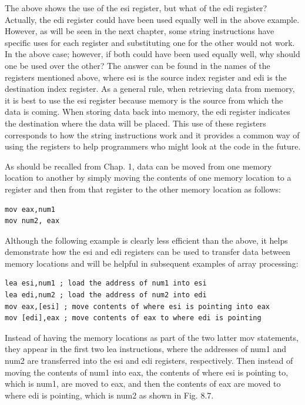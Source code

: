 \documentclass[10pt]{book}
\begin{document}
\begin{center}
\begin{center}
\begin{center}
The above shows the use of the esi register, but what of the edi register? Actually, the edi register could have been used equally well in the above example. However, as will be seen in the next chapter, some string instructions have specific uses for each register and substituting one for the other would not work. In the above case; however, if both could have been used equally well, why should one be used over the other? The answer can be found in the names of the registers mentioned above, where esi is the source index register and edi is the destination index register. As a general rule, when retrieving data from memory, it is best to use the esi register because memory is the source from which the data is coming. When storing data back into memory, the edi register indicates the destination where the data will be placed. This use of these registers corresponds to how the string instructions work and it provides a common way of using the registers to help programmers who might look at the code in the future.

As should be recalled from Chap. 1, data can be moved from one memory location to another by simply moving the contents of one memory location to a register and then from that register to the other memory location as follows:

\begin{verbatim}
mov eax,num1
mov num2, eax
\end{verbatim}

Although the following example is clearly less efficient than the above, it helps demonstrate how the esi and edi registers can be used to transfer data between memory locations and will be helpful in subsequent examples of array processing:

\begin{verbatim}
lea esi,num1 ; load the address of num1 into esi
lea edi,num2 ; load the address of num2 into edi
mov eax,[esi] ; move contents of where esi is pointing into eax
mov [edi],eax ; move contents of eax to where edi is pointing
\end{verbatim}

Instead of having the memory locations as part of the two latter mov statements, they appear in the first two lea instructions, where the addresses of num1 and num2 are transferred into the esi and edi registers, respectively. Then instead of moving the contents of num1 into eax, the contents of where esi is pointing to, which is num1, are moved to eax, and then the contents of eax are moved to where edi is pointing, which is num2 as shown in Fig. 8.7.


\end{center}
\end{center}
\end{center}
\end{document}
